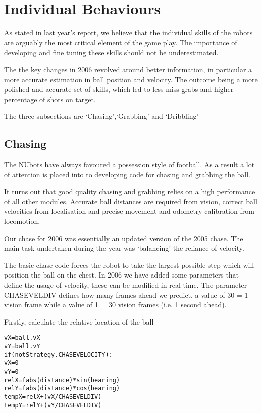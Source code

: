 \section{Individual Behaviours}
\label{indBehaviour}

As stated in last year's report, we believe that the individual skills of the robots are arguably
the most critical element of the game play. The importance of
developing and fine tuning these skills should not be
underestimated.

The the key changes in 2006 revolved around better information, in particular a more accurate estimation in ball position and velocity. The outcome being a more polished and accurate set of skills, which led to less miss-grabs and higher percentage of shots on target.

The three subsections are `Chasing',`Grabbing' and `Dribbling'

\subsection{Chasing}

The NUbots have always favoured a possession style of football. As a result
a lot of attention is placed into to developing code for chasing
and grabbing the ball.

It turns out that good quality chasing and grabbing relies on a
high performance of all other modules. Accurate ball distances are
required from vision, correct ball velocities from localisation
and precise movement and odometry calibration from locomotion.

Our chase for 2006 was essentially an updated version of the 2005 chase. The main task undertaken during the year was `balancing' the reliance of velocity.

The basic chase code forces the robot to take the largest possible
step which will position the ball on the chest. In 2006 we have added some parameters that define the usage of velocity, these can be modified in real-time. The parameter CHASEVELDIV defines how many frames ahead we predict, a value of 30 = 1 vision frame while a value of 1 = 30 vision frames (i.e. 1 second ahead).

Firstly, calculate the relative location of the ball -
\begin{alltt}
  vX = ball.vX
  vY = ball.vY
  if (not Strategy.CHASEVELOCITY):
    vX = 0
    vY = 0
  relX = fabs(distance) * sin(bearing)
  relY = fabs(distance) * cos(bearing)
  tempX = relX + (vX/CHASEVELDIV) 
  tempY = relY + (vY/CHASEVELDIV)
\end{alltt}

